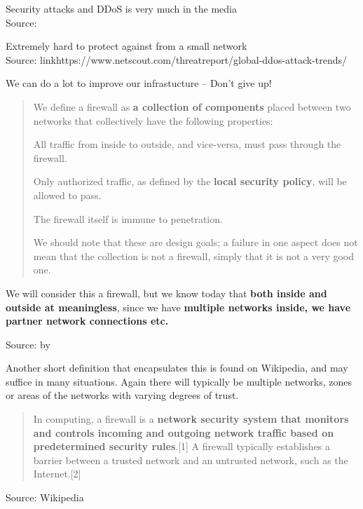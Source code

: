 \documentclass[Screen16to9,17pt]{foils}
\begin{document}

Security attacks and DDoS is very much in the media\\
Source: 



Extremely hard to protect against from a small network\\
Source: link{https://www.netscout.com/threatreport/global-ddos-attack-trends/}

We can do a lot to improve our infrastucture -- Don't give up!


\begin{quote}
We define a firewall as {\bf a collection of components} placed between two networks that collectively have
the following properties:
\begin{list2}
\item All traffic from inside to outside, and vice-versa, must pass through the firewall.
\item Only authorized traffic, as defined by the {\bf local security policy}, will be allowed to pass.
\item The firewall itself is immune to penetration.
\end{list2}
We should note that these are design goals; a failure in one aspect does not mean that the collection
is not a firewall, simply that it is not a very good one.
\end{quote}

We will consider this a firewall, but we know today that {\bf both inside and outside at meaningless}, since we have {\bf multiple networks inside, we have partner network connections etc.}

Source:  by \citeauthor{Cheswick94} \citeyear{Cheswick94}


Another short definition that encapsulates this is found on Wikipedia, and may suffice in many situations. Again there will typically be multiple networks, zones or areas of the networks with varying degrees of trust.
\begin{quote}
In computing, a firewall is a {\bf network security system that monitors and controls incoming and outgoing network traffic based on predetermined security rules}.[1] A firewall typically establishes a barrier between a trusted network and an untrusted network, such as the Internet.[2]
\end{quote}
Source: Wikipedia
\end{document}
